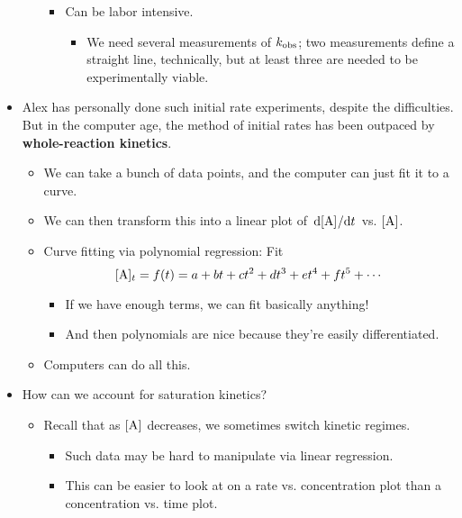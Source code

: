 \documentclass[../notes.tex]{subfiles}
\begin{document}
\begin{itemize}
\begin{itemize}
\begin{itemize}
            \item Can be labor intensive.
            \begin{itemize}
                \item We need several measurements of $k_\textup{obs}$; two measurements define a straight line, technically, but at least three are needed to be experimentally viable.
            \end{itemize}
        \end{itemize}
    \end{itemize}
    \item Alex has personally done such initial rate experiments, despite the difficulties. But in the computer age, the method of initial rates has been outpaced by \textbf{whole-reaction kinetics}.
    \begin{itemize}
        \item We can take a bunch of data points, and the computer can just fit it to a curve.
        \item We can then transform this into a linear plot of $\dv*{\cnc{A}}{t}$ vs. $\cnc{A}$.
        \item Curve fitting via polynomial regression: Fit
        \begin{equation*}
            \cnc[$t$]{A} = f(t) = a+bt+ct^2+dt^3+et^4+ft^5+\cdots
        \end{equation*}
        \begin{itemize}
            \item If we have enough terms, we can fit basically anything!
            \item And then polynomials are nice because they're easily differentiated.
        \end{itemize}
        \item Computers can do all this.
    \end{itemize}
    \item How can we account for saturation kinetics?
    \begin{itemize}
        \item Recall that as $\cnc{A}$ decreases, we sometimes switch kinetic regimes.
        \begin{itemize}
            \item Such data may be hard to manipulate via linear regression.
            \item This can be easier to look at on a rate vs. concentration plot than a concentration vs. time plot.
        \end{itemize}

\end{itemize}
\end{itemize}
\end{document}
